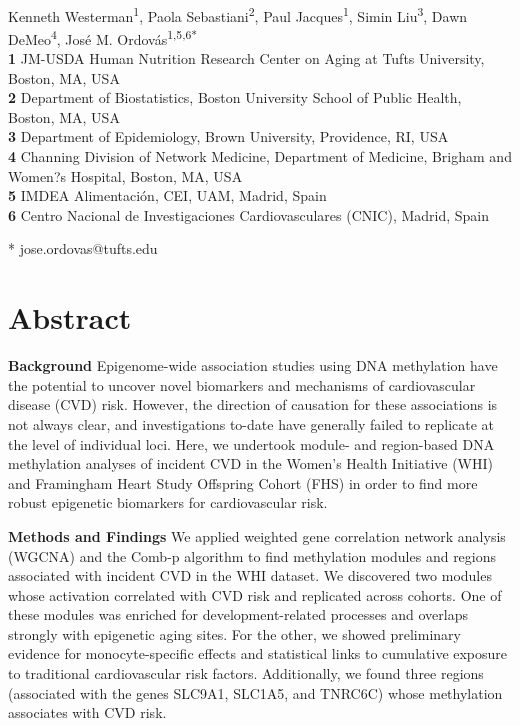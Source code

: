 \documentclass[]{article}
\title{}
\author{}
\date{}
\theoremstyle{definition}
\theoremstyle{definition}
\theoremstyle{definition}
\theoremstyle{remark}
\begin{document}
\begin{flushleft}
{\Large
\textbf{}
}
\newline
\\
Kenneth Westerman\textsuperscript{1},
Paola Sebastiani\textsuperscript{2},
Paul Jacques\textsuperscript{1},
Simin Liu\textsuperscript{3},
Dawn DeMeo\textsuperscript{4},
Jos\'e M. Ordov\'as\textsuperscript{1,5,6*}
\\
\bigskip
\textbf{1} JM-USDA Human Nutrition Research Center on Aging at Tufts University, Boston, MA, USA
\\
\textbf{2} Department of Biostatistics, Boston University School of Public Health, Boston, MA, USA
\\
\textbf{3} Department of Epidemiology, Brown University, Providence, RI, USA
\\
\textbf{4} Channing Division of Network Medicine, Department of Medicine, Brigham and Women?s Hospital, Boston, MA, USA
\\
\textbf{5} IMDEA Alimentaci\'on, CEI, UAM, Madrid, Spain
\\
\textbf{6} Centro Nacional de Investigaciones Cardiovasculares (CNIC), Madrid, Spain
\\
\bigskip

* jose.ordovas@tufts.edu

\end{flushleft}

\section{Abstract}\label{abstract}

\textbf{Background} Epigenome-wide association studies using DNA
methylation have the potential to uncover novel biomarkers and
mechanisms of cardiovascular disease (CVD) risk. However, the direction
of causation for these associations is not always clear, and
investigations to-date have generally failed to replicate at the level
of individual loci. Here, we undertook module- and region-based DNA
methylation analyses of incident CVD in the Women's Health Initiative
(WHI) and Framingham Heart Study Offspring Cohort (FHS) in order to find
more robust epigenetic biomarkers for cardiovascular risk.

\textbf{Methods and Findings} We applied weighted gene correlation
network analysis (WGCNA) and the Comb-p algorithm to find methylation
modules and regions associated with incident CVD in the WHI dataset. We
discovered two modules whose activation correlated with CVD risk and
replicated across cohorts. One of these modules was enriched for
development-related processes and overlaps strongly with epigenetic
aging sites. For the other, we showed preliminary evidence for
monocyte-specific effects and statistical links to cumulative exposure
to traditional cardiovascular risk factors. Additionally, we found three
regions (associated with the genes SLC9A1, SLC1A5, and TNRC6C) whose
methylation associates with CVD risk.
\end{document}
